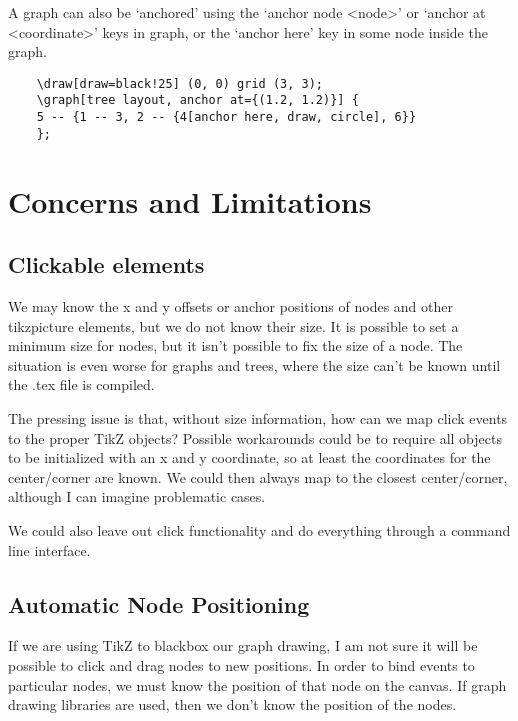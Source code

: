 \documentclass{article}
\begin{document}
  A graph can also be `anchored' using the `anchor node <node>' or `anchor at <coordinate>'
  keys in graph, or the `anchor here' key in some node inside the graph.

  \begin{verbatim}
    \draw[draw=black!25] (0, 0) grid (3, 3);
    \graph[tree layout, anchor at={(1.2, 1.2)}] {
    5 -- {1 -- 3, 2 -- {4[anchor here, draw, circle], 6}}
    };
  \end{verbatim}
  


\section*{Concerns and Limitations}

\subsection*{Clickable elements}
We may know the x and y offsets or anchor positions of nodes and other tikzpicture
elements, but we do not know their size. It is possible to set a minimum size
for nodes, but it isn't possible to fix the size of a node. The situation
is even worse for graphs and trees, where the size can't be known until the
.tex file is compiled. 

The pressing issue is that, without size information, how can we map click events to
the proper TikZ objects? Possible workarounds could be to require all objects
to be initialized with an x and y coordinate, so at least the coordinates
for the center/corner are known. We could then always map to the closest center/corner,
although I can imagine problematic cases.

We could also leave out click functionality and do everything through a
command line interface.

\subsection*{Automatic Node Positioning}
If we are using TikZ to blackbox our graph drawing, I am not sure it will be
possible to click and drag nodes to new positions. In order to bind events
to particular nodes, we must know the position of that node on the canvas.
If graph drawing libraries are used, then we don't know the position of the nodes.
\end{document}
